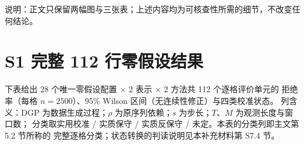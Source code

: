 \documentclass[UTF8,zihao=-4]{ctexart}
\theoremstyle{remark}
\begin{document}
\vspace{0.5em}
\noindent 说明：正文只保留两幅图与三张表；上述内容均为可核查性所需的细节，不改变任何结论。

\section*{S1 完整 112 行零假设结果}

下表给出 28 个唯一零假设配置 $\times$ 2 表示 $\times$ 2 方法共 112 个逐格评价单元的
拒绝率（每格 $n=2500$）、95\% Wilson 区间（无连续性修正）与四类校准状态。
列含义：DGP 为数据生成过程；$\rho$ 为原序列依赖；$s$ 为步长；$T$、$M$ 为观测长度与窗口数；
分类取实用校准 / 实质保守 / 实质反保守 / 未定。本表的分类列即主文第 5.2 节所称的
完整逐格分类；状态转换的判读说明见本补充材料第 S7.4 节。

\begingroup
\footnotesize
\end{document}
